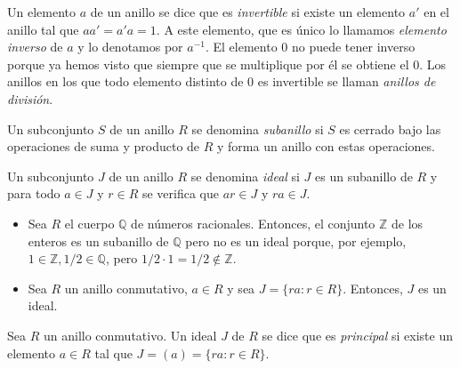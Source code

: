 
Un elemento \(a\) de un anillo se dice que es \textit{invertible} si existe un elemento \(a'\) en el anillo tal que \(aa' = a'a = 1\).
A este elemento, que es único lo llamamos \textit{elemento inverso} de \(a\) y lo denotamos por \(a^{-1}\).
El elemento \(0\) no puede tener inverso porque ya hemos visto que siempre que se multiplique por él se obtiene el \(0\).
Los anillos en los que todo elemento distinto de 0 es invertible se llaman \textit{anillos de división}.



\begin{definition}[Subanillo]
  Un subconjunto \(S\) de un anillo \(R\) se denomina \textit{subanillo} si \(S\) es cerrado bajo las operaciones de suma y producto de \(R\) y forma un anillo con estas operaciones.
\end{definition}

\begin{definition}[Ideal]
  Un subconjunto \(J\) de un anillo \(R\) se denomina \textit{ideal} si \(J\) es un subanillo de \(R\) y para todo \(a \in J\) y \(r \in R\) se verifica que \(ar \in J\) y \(ra \in J\).
\end{definition}

\begin{example}\hfill
  \begin{itemize}
    \item Sea \(R\) el cuerpo \(\mathbb Q\) de números racionales. Entonces, el conjunto \(\mathbb Z\) de los enteros es un subanillo de \(\mathbb Q\) pero no es un ideal porque, por ejemplo, \(1 \in \mathbb Z, 1/2 \in \mathbb Q\), pero \(1/2 \cdot 1 = 1/2 \notin \mathbb Z\). 
    \item Sea \(R\) un anillo conmutativo, \(a \in R\) y sea \(J = \{ra : r \in R\}\). Entonces, \(J\) es un ideal.
  \end{itemize}
\end{example}

\begin{definition}
  Sea \(R\) un anillo conmutativo. Un ideal \(J\) de \(R\) se dice que es \textit{principal} si existe un elemento \(a \in R\) tal que \(J = (a) = \{ra : r \in R\}\).
\end{definition}

